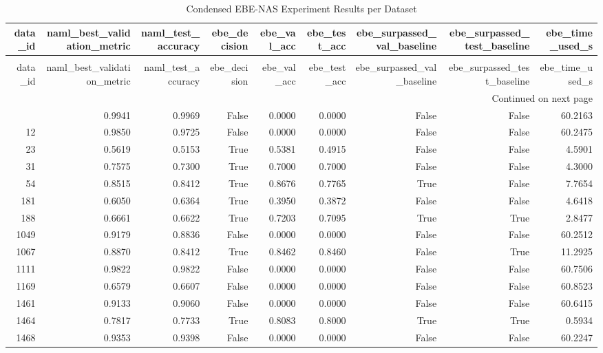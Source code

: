 \begin{longtable}{rrrrrrrrr}
\caption{Condensed EBE-NAS Experiment Results per Dataset} \label{tab:master_results} \\
\toprule
data\_id & naml\_best\_validation\_metric & naml\_test\_accuracy & ebe\_decision & ebe\_val\_acc & ebe\_test\_acc & ebe\_surpassed\_val\_baseline & ebe\_surpassed\_test\_baseline & ebe\_time\_used\_s \\
\midrule
\endfirsthead
\caption[]{Condensed EBE-NAS Experiment Results per Dataset} \\
\toprule
data\_id & naml\_best\_validation\_metric & naml\_test\_accuracy & ebe\_decision & ebe\_val\_acc & ebe\_test\_acc & ebe\_surpassed\_val\_baseline & ebe\_surpassed\_test\_baseline & ebe\_time\_used\_s \\
\midrule
\endhead
\midrule
\multicolumn{9}{r}{Continued on next page} \\
\midrule
\endfoot
\bottomrule
\endlastfoot
3 & 0.9941 & 0.9969 & False & 0.0000 & 0.0000 & False & False & 60.2163 \\
12 & 0.9850 & 0.9725 & False & 0.0000 & 0.0000 & False & False & 60.2475 \\
23 & 0.5619 & 0.5153 & True & 0.5381 & 0.4915 & False & False & 4.5901 \\
31 & 0.7575 & 0.7300 & True & 0.7000 & 0.7000 & False & False & 4.3000 \\
54 & 0.8515 & 0.8412 & True & 0.8676 & 0.7765 & True & False & 7.7654 \\
181 & 0.6050 & 0.6364 & True & 0.3950 & 0.3872 & False & False & 4.6418 \\
188 & 0.6661 & 0.6622 & True & 0.7203 & 0.7095 & True & True & 2.8477 \\
1049 & 0.9179 & 0.8836 & False & 0.0000 & 0.0000 & False & False & 60.2512 \\
1067 & 0.8870 & 0.8412 & True & 0.8462 & 0.8460 & False & True & 11.2925 \\
1111 & 0.9822 & 0.9822 & False & 0.0000 & 0.0000 & False & False & 60.7506 \\
1169 & 0.6579 & 0.6607 & False & 0.0000 & 0.0000 & False & False & 60.8523 \\
1461 & 0.9133 & 0.9060 & False & 0.0000 & 0.0000 & False & False & 60.6415 \\
1464 & 0.7817 & 0.7733 & True & 0.8083 & 0.8000 & True & True & 0.5934 \\
1468 & 0.9353 & 0.9398 & False & 0.0000 & 0.0000 & False & False & 60.2247 \\

\end{longtable}
